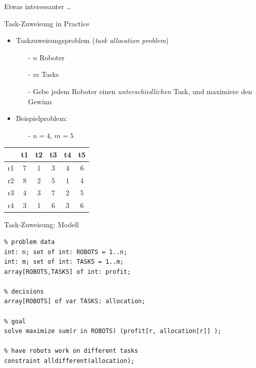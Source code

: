 \begin{frame}[fragile]{Etwas interessanter \ldots}
\small

\end{frame}

\begin{frame}{Task-Zuweisung in Practice}
\begin{itemize}
\item Taskzuweisungsproblem (\emph{task allocation problem})

\begin{itemize}
\item [-] $n$ Roboter
\item [-] $m$ Tasks
\item [-] Gebe jedem Roboter einen \emph{unterschiedlichen} Task, und maximiere den Gewinn 
\end{itemize}
\item Beispielproblem:
\begin{itemize}
\item[-] $n = 4$, $m = 5$
\end{itemize}
\end{itemize}
\centering
\begin{tabular}{|c|c|c|c|c|c|}
\hline 
 & t1 & t2 & t3 & t4 & t5 \\ 
\hline 
r1 & 7 & 1 & 3 & 4 & 6 \\ 
\hline 
r2 & 8 & 2 & 5 & 1 & 4 \\ 
\hline 
r3 & 4 & 3 & 7 & 2 & 5 \\ 
\hline 
r4 & 3 & 1 & 6 & 3 & 6 \\ 
\hline 
\end{tabular} 
\end{frame}


\begin{frame}[fragile]{Task-Zuweisung: Modell}
\begin{lstlisting}
% problem data 
int: n; set of int: ROBOTS = 1..n;
int: m; set of int: TASKS = 1..m;
array[ROBOTS,TASKS] of int: profit;

% decisions
array[ROBOTS] of var TASKS: allocation;

% goal
solve maximize sum(r in ROBOTS) (profit[r, allocation[r]] );

% have robots work on different tasks
constraint alldifferent(allocation);
\end{lstlisting}
\end{frame}

